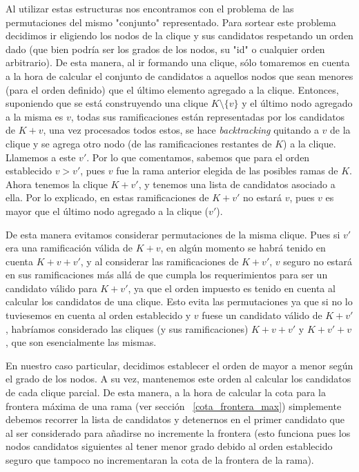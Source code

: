 \par Al utilizar estas estructuras nos encontramos
    con el problema de las permutaciones del mismo "conjunto" representado. Para sortear
    este problema decidimos ir eligiendo los nodos de la clique y sus candidatos respetando
    un orden dado (que bien podr\'ia ser los grados de los nodos, su "id" o cualquier orden
    arbitrario). De esta manera, al ir formando una clique, s\'olo tomaremos en cuenta a
    la hora de calcular el conjunto de candidatos a aquellos nodos que sean menores (para
    el orden definido) que el \'ultimo elemento agregado a la clique. Entonces, suponiendo
    que se est\'a construyendo una clique $K\setminus\{v\}$ y el \'ultimo nodo agregado a la misma es $v$,
    todas sus ramificaciones est\'an representadas por los candidatos de $K+v$, una vez
    procesados todos estos, se hace \emph{backtracking} quitando a $v$ de la clique y se
    agrega otro nodo (de las ramificaciones restantes de $K$) a la clique. Llamemos a este
    $v'$. Por lo que comentamos, sabemos que para el orden establecido $v > v'$, pues
    $v$ fue la rama anterior elegida de las posibles ramas de $K$. Ahora tenemos la
    clique $K+v'$, y tenemos una lista de candidatos asociado a ella. Por lo explicado,
    en estas ramificaciones de $K+v'$ no estar\'a $v$, pues $v$ es mayor que el \'ultimo
    nodo agregado a la clique ($v'$).

\par De esta manera evitamos considerar permutaciones de la misma clique. Pues si $v'$
    era una ramificaci\'on v\'alida de $K+v$, en alg\'un momento se habr\'a tenido
    en cuenta $K+v+v'$, y al considerar las ramificaciones de $K+v'$, $v$ seguro
    no estar\'a en sus ramificaciones m\'as all\'a de que cumpla los requerimientos
    para ser un candidato v\'alido para $K+v'$, ya que el orden impuesto es tenido
    en cuenta al calcular los candidatos de una clique. Esto evita las permutaciones ya
    que si no lo tuviesemos en cuenta al orden establecido y $v$ fuese un candidato
    v\'alido de $K+v'$, habr\'iamos considerado las cliques (y sus ramificaciones)
    $K+v+v'$ y $K+v'+v$, que son esencialmente las mismas.

\par En nuestro caso particular, decidimos establecer el orden de mayor a menor
    seg\'un el grado de los nodos. A su vez, mantenemos este orden al calcular
    los candidatos de cada clique parcial. De esta manera, a la hora de calcular
    la cota para la frontera m\'axima de una rama (ver secci\'on ~\ref{cota_frontera_max})
    simplemente debemos recorrer la lista de candidatos y detenernos en el primer
    candidato que al ser considerado para a\~nadirse no incremente la frontera
    (esto funciona pues los nodos candidatos siguientes al tener menor grado
    debido al orden establecido seguro que tampoco no incrementaran la cota
    de la frontera de la rama). \label{orden_establecido}

